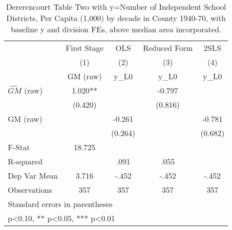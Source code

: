 \begin{table}[htbp]\centering
\def\sym#1{\ifmmode^{#1}\else\(^{#1}\)\fi}
\caption{Dererencourt Table Two with y=Number of Independent School Districts, Per Capita (1,000) by decade in County 1940-70, with baseline y and division FEs, above median area incorporated.}
\begin{tabular}{l*{4}{c}}
\toprule
                    & First Stage   &         OLS   &Reduced Form   &        2SLS   \\
                    &\multicolumn{1}{c}{(1)}&\multicolumn{1}{c}{(2)}&\multicolumn{1}{c}{(3)}&\multicolumn{1}{c}{(4)}\\
                    &\multicolumn{1}{c}{GM  (raw)}&\multicolumn{1}{c}{y\_L0}&\multicolumn{1}{c}{y\_L0}&\multicolumn{1}{c}{y\_L0}\\
\midrule
$\hat{GM}$ (raw)    &       1.020** &               &      -0.797   &               \\
                    &     (0.420)   &               &     (0.816)   &               \\
\addlinespace
GM  (raw)           &               &      -0.261   &               &      -0.781   \\
                    &               &     (0.264)   &               &     (0.682)   \\
\midrule
F-Stat              &      18.725   &               &               &               \\
R-squared           &               &        .091   &        .055   &               \\
Dep Var Mean        &       3.716   &       -.452   &       -.452   &       -.452   \\
Observations        &         357   &         357   &         357   &         357   \\
\bottomrule
\multicolumn{5}{l}{\footnotesize Standard errors in parentheses}\\
\multicolumn{5}{l}{\footnotesize * p<0.10, ** p<0.05, *** p<0.01}\\
\end{tabular}
\end{table}
